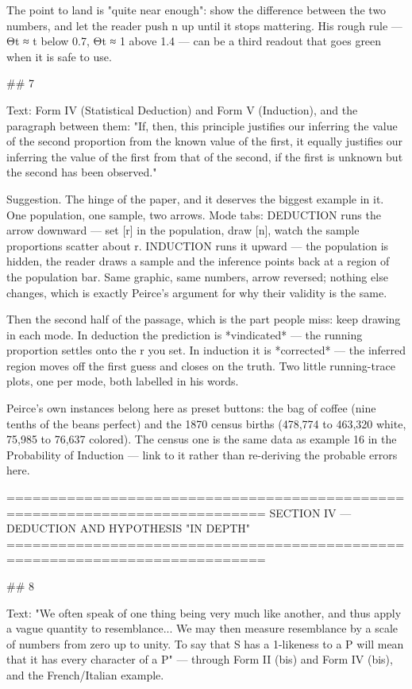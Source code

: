 The point to land is "quite near enough": show the difference between the two
numbers, and let the reader push n up until it stops mattering. His rough rule —
Θt ≈ t below 0.7, Θt ≈ 1 above 1.4 — can be a third readout that goes green when
it is safe to use.


## 7

Text: Form IV (Statistical Deduction) and Form V (Induction), and the paragraph
between them: "If, then, this principle justifies our inferring the value of the
second proportion from the known value of the first, it equally justifies our
inferring the value of the first from that of the second, if the first is
unknown but the second has been observed."

Suggestion. The hinge of the paper, and it deserves the biggest example in it.
One population, one sample, two arrows. Mode tabs: DEDUCTION runs the arrow
downward — set [r] in the population, draw [n], watch the sample proportions
scatter about r. INDUCTION runs it upward — the population is hidden, the reader
draws a sample and the inference points back at a region of the population bar.
Same graphic, same numbers, arrow reversed; nothing else changes, which is
exactly Peirce's argument for why their validity is the same.

Then the second half of the passage, which is the part people miss: keep drawing
in each mode. In deduction the prediction is *vindicated* — the running
proportion settles onto the r you set. In induction it is *corrected* — the
inferred region moves off the first guess and closes on the truth. Two little
running-trace plots, one per mode, both labelled in his words.

Peirce's own instances belong here as preset buttons: the bag of coffee (nine
tenths of the beans perfect) and the 1870 census births (478,774 to 463,320
white, 75,985 to 76,637 colored). The census one is the same data as example 16
in the Probability of Induction — link to it rather than re-deriving the
probable errors here.


============================================================================
SECTION IV — DEDUCTION AND HYPOTHESIS "IN DEPTH"
============================================================================

## 8

Text: "We often speak of one thing being very much like another, and thus apply
a vague quantity to resemblance... We may then measure resemblance by a scale of
numbers from zero up to unity. To say that S has a 1-likeness to a P will mean
that it has every character of a P" — through Form II (bis) and Form IV (bis),
and the French/Italian example.

